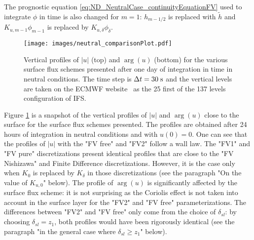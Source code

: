 The prognostic equation \eqref{eq:ND_NeutralCase_continuityEquationFV}
used to integrate $\phi$ in time
is also changed for $m=1$: $h_{m-1/2}$ is replaced
with $\widetilde{h}$ and $K_{u, m-1}\phi_{m-1}$ is replaced by
$K_{u,\delta}\phi_{\delta}$.
%
\begin{figure}[htpb]
	\centering
	\texttt{[image: images/neutral\_comparisonPlot.pdf]}
	\caption[Vertical profiles of $|u|$ and $\arg(u)$]
	{Vertical profiles of $|u|$ (top) and $\arg(u)$ (bottom)
	for the various surface flux schemes presented
	after one day of integration in time in neutral conditions.
	The time step is $\Delta t = 30 \;{\rm s}$
	and the vertical levels are taken
	on the ECMWF website\footnotemark ~ as the 25 first
	of the 137 levels configuration of IFS.
	}
	\label{fig:ND_NeutralCase_comparisonPlot}
\end{figure}
\par
Figure \ref{fig:ND_NeutralCase_comparisonPlot} is a snapshot of
the vertical profiles of $|u|$ and $\arg(u)$ close to the surface
for the surface flux schemes presented.
The profiles are obtained after 24 hours of integration in neutral
conditions and with $u(0) = 0$.
One can see that the profiles of $|u|$ with the "FV free" and "FV2"
follow a wall law. The "FV1" and "FV pure" discretizations
present identical profiles that are close to the "FV Nishizawa" and
Finite Difference discretizations.
However, it is the case only when $K_0$ is
replaced by $K_{\delta}$ in those discretizations
(see the paragraph "On the value of $K_{u,0}$" below).
The profile of $\arg(u)$ is significantly affected by the surface
flux scheme: it is not surprising as the Coriolis effect is
not taken into account in the surface layer for the "FV2" and
"FV free" parameterizations.
The differences between "FV2" and "FV free" only come from the
choice of $\delta_{sl}$:
by choosing $\delta_{sl}=z_1$, both profiles would have been
rigorously identical
(see the paragraph "in the general case where
$\delta_{sl} \geq z_1$" below).
